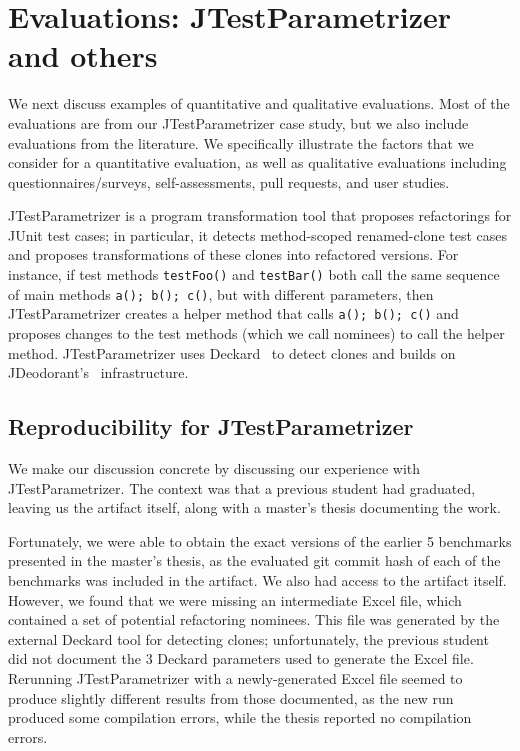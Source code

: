 \section{Evaluations: JTestParametrizer and others}
\label{sec:our-evaluation-process}

We next discuss examples of quantitative and qualitative
evaluations. Most of the evaluations are from our JTestParametrizer
case study, but we also include evaluations from the literature. 
We specifically illustrate the factors that we consider for
a quantitative evaluation, as well as qualitative evaluations
including questionnaires/surveys, self-assessments, pull requests,
and user studies.

JTestParametrizer is a program transformation tool that proposes refactorings for JUnit test cases; in particular, it detects method-scoped renamed-clone test cases and proposes transformations of these clones into refactored versions. For instance, if test methods \texttt{testFoo()} and \texttt{testBar()} both call the same sequence of main methods \texttt{a(); b(); c()}, but with different parameters, then JTestParametrizer creates a helper method that calls \texttt{a(); b(); c()} and proposes changes to the test methods (which we call nominees) to call the helper method. JTestParametrizer uses Deckard~\cite{jiang07:_deckar} to detect clones and builds on JDeodorant's~\cite{mazinanian16:_jdeod} infrastructure.

\subsection{Reproducibility for JTestParametrizer}
We make our discussion concrete by discussing our experience with JTestParametrizer. The context was that a previous student had graduated, leaving us the artifact itself, along with a master's thesis documenting the work. 

Fortunately, we were able to obtain the exact versions of the earlier 5 benchmarks presented in the master's thesis, as the evaluated git commit hash of each of the benchmarks was included in the artifact. We also had access to the artifact itself. However, we found that we were missing an intermediate Excel file, which contained a set of potential refactoring nominees. This file was generated by the external Deckard tool for detecting clones; unfortunately, the previous student did not document the 3 Deckard parameters used to generate the Excel file. Rerunning JTestParametrizer with a newly-generated Excel file seemed to produce slightly different results from those documented, as the new run produced some compilation errors, while the thesis reported no compilation errors.

